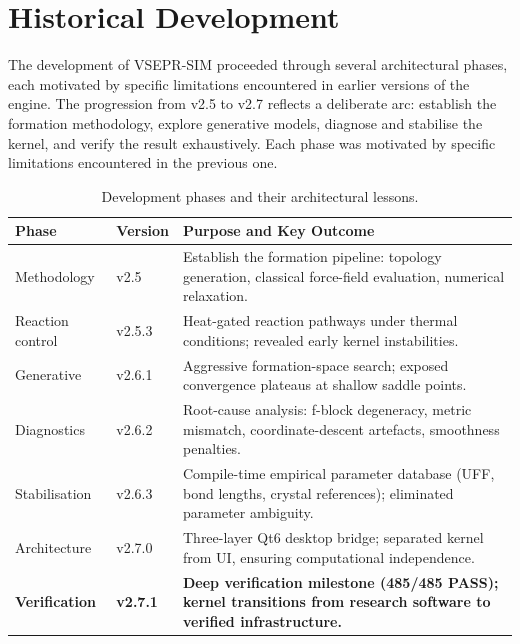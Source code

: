 \documentclass[11pt,twoside]{article}
\begin{document}
\section{Historical Development}
\label{sec:history}

The development of VSEPR-SIM proceeded through several architectural phases, each motivated by specific limitations encountered in earlier versions of the engine. The progression from v2.5 to v2.7 reflects a deliberate arc: establish the formation methodology, explore generative models, diagnose and stabilise the kernel, and verify the result exhaustively. Each phase was motivated by specific limitations encountered in the previous one.

\begin{table}[H]
\centering
\caption{Development phases and their architectural lessons.}
\label{tab:phases}
\begin{tabular}{llp{7.5cm}}
\toprule
\textbf{Phase} & \textbf{Version} & \textbf{Purpose and Key Outcome} \\
\midrule
Methodology     & v2.5   & Establish the formation pipeline: topology generation, classical force-field evaluation, numerical relaxation. \\
Reaction control & v2.5.3 & Heat-gated reaction pathways under thermal conditions; revealed early kernel instabilities. \\
Generative       & v2.6.1 & Aggressive formation-space search; exposed convergence plateaus at shallow saddle points. \\
Diagnostics      & v2.6.2 & Root-cause analysis: f-block degeneracy, metric mismatch, coordinate-descent artefacts, smoothness penalties. \\
Stabilisation    & v2.6.3 & Compile-time empirical parameter database (UFF, bond lengths, crystal references); eliminated parameter ambiguity. \\
Architecture     & v2.7.0 & Three-layer Qt6 desktop bridge; separated kernel from UI, ensuring computational independence. \\
\textbf{Verification} & \textbf{v2.7.1} & \textbf{Deep verification milestone (485/485 PASS); kernel transitions from research software to verified infrastructure.} \\
\bottomrule
\end{tabular}
\end{table}
\end{document}

